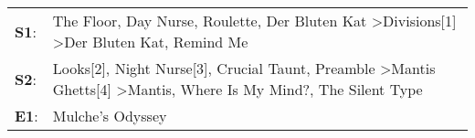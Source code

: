 \begin{supertabular}{p{0.03\textwidth}p{0.92\textwidth}}
 \textbf{S1}:  &                                                     The Floor\textsuperscript{}, \enspace Day Nurse\textsuperscript{}, \enspace Roulette\textsuperscript{}, \enspace Der Bluten Kat\textsuperscript{} \textgreater \enspace Divisions[1]\textsuperscript{} \textgreater \enspace Der Bluten Kat\textsuperscript{}, \enspace Remind Me\textsuperscript{}  \enspace  \\
 \textbf{S2}:  &  Looks[2]\textsuperscript{}, \enspace Night Nurse[3]\textsuperscript{}, \enspace Crucial Taunt\textsuperscript{}, \enspace Preamble\textsuperscript{} \textgreater \enspace Mantis Ghetts[4]\textsuperscript{} \textgreater \enspace Mantis\textsuperscript{}, \enspace Where Is My Mind?\textsuperscript{}, \enspace The Silent Type\textsuperscript{}  \enspace  \\
 \textbf{E1}:  &                                                                                                                                                                                                                                                                                                                      Mulche's Odyssey\textsuperscript{}  \enspace  \\
\end{supertabular}
